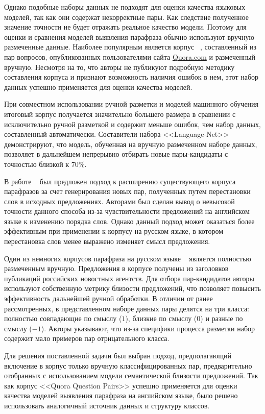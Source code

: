 \documentclass[a4paper,14pt]{extarticle}
\begin{document}
Однако подобные наборы данных не подходят для оценки качества языковых моделей, так как они содержат некорректные пары. Как следствие полученное значение точности не будет отражать реальное качество модели.
Поэтому для оценки и сравнения моделей выявления парафраза обычно используют вручную размеченные данные.
Наиболее популярным является корпус ~\autocite{iyer_csernai_dandekar_2017}, составленный из пар вопросов, опубликованных пользователями сайта \href{https://www.quora.com/}{Quora.com} и размеченный вручную.
Несмотря на то, что авторы не публикуют подробную методику составления корпуса и признают возможность наличия ошибок в нем, этот набор данных успешно применяется для оценки качества моделей.

При совместном использовании ручной разметки и моделей машинного обучения итоговый корпус получается значительно большего размера в сравнении с исключительно ручной разметкой и содержит меньше ошибок, чем набор данных, составленный автоматически.
Составители набора {<<Language-Net>>}~\autocite{lan-etal-2017-continuously} демонстрируют, что модель, обученная на вручную размеченном наборе данных, позволяет в дальнейшем непрерывно отбирать новые пары-кандидаты с точностью близкой к $70\%$.

В работе ~\autocite{zhang2019paws} был предложен подход к расширению существующего корпуса парафразов за счет генерирования новых пар, полученных путем перестановки слов в исходных предложениях. Авторами был сделан вывод о невысокой точности данного способа из-за чувствительности предложений на английском языке к изменению порядка слов. Однако данный подход может оказаться более эффективным при применении к корпусу на русском языке, в котором перестановка слов менее выражено изменяет смысл предложения.

Один из немногих корпусов парафраза на русском языке ~\autocite{pivovarova2017paraphraser} является полностью размеченным вручную. Предложения в корпусе получены из заголовков публикаций российских новостных агентств.
Для отбора пар-кандидатов авторы используют собственную метрику близости предложений, что позволяет повысить эффективность дальнейшей ручной обработки. В отличии от ранее рассмотренных, в представленном наборе данных пары делятся на три класса: полностью совпадающие по смыслу ($1$), близкие по смыслу ($0$) и разные по смыслу ($-1$).
Авторы указывают, что из-за специфики процесса разметки набор содержит мало примеров пар отрицательного класса.

Для решения поставленной задачи был выбран подход, предполагающий включение в корпус только вручную классифицированных пар, предварительно отобранных с использованием модели семантической близости предложений.
Так как корпус {<<Quora Question Pairs>>} успешно применяется для оценки качества моделей выявления парафраза на английском языке, было решено использовать аналогичный источник данных и структуру классов.
\end{document}
